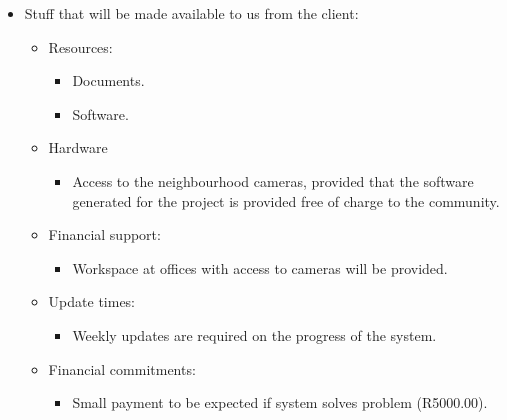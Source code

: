 \documentclass[letterpaper]{article}
\begin{document}
		\vspace{0.2in}
		\begin{itemize}
			\item Stuff that will be made available to us from the client: 
			\begin{itemize}
				\item	Resources:
				\begin{itemize}				
				\item	Documents.
				\item	Software.
				\end{itemize}
				
				\item	Hardware
				\begin{itemize}
				\item	Access to the neighbourhood cameras, provided that the software generated for the project is provided free of charge to the community.
				\end{itemize}
				
				\item	Financial support:
				\begin{itemize}
				\item	Workspace at offices with access to cameras will be provided.
				\end{itemize}
				
				\item Update times:
				\begin{itemize}
				\item Weekly updates are required on the progress of the system.	
				\end{itemize}	
				
				\item Financial commitments:
				\begin{itemize}
				\item Small payment to be expected if system solves problem (R5000.00).	
				\end{itemize}	
		\end{itemize}
		\end{itemize}
		
		\vspace{0.2in}
		
\end{document}
